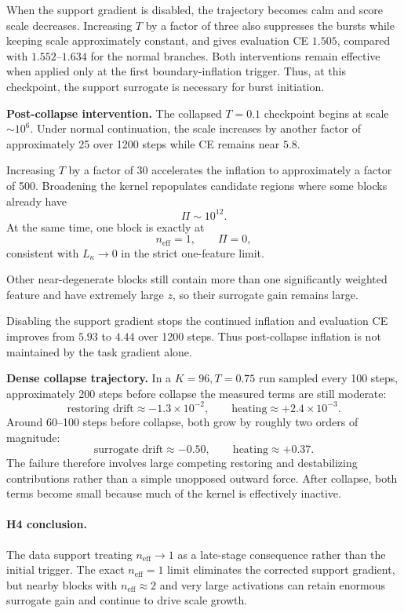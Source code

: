 \documentclass[11pt,a4paper]{article}
\newcommand{\neff}{n_{\mathrm{eff}}}
\newcommand{\Pisurr}{\Pi}
\begin{document}
When the support gradient is disabled, the trajectory becomes calm and score scale decreases. Increasing \(T\) by a factor of three also suppresses the bursts while keeping scale approximately constant, and gives evaluation CE \(1.505\), compared with \(1.552\)--\(1.634\) for the normal branches. Both interventions remain effective when applied only at the first boundary-inflation trigger. Thus, at this checkpoint, the support surrogate is necessary for burst initiation.

\textbf{Post-collapse intervention.}
The collapsed \(T=0.1\) checkpoint begins at scale \(\sim10^6\). Under normal continuation, the scale increases by another factor of approximately 25 over 1200 steps while CE remains near \(5.8\).

Increasing \(T\) by a factor of 30 accelerates the inflation to approximately a factor of 500. Broadening the kernel repopulates candidate regions where some blocks already have
\[
\Pisurr\sim10^{12}.
\]
At the same time, one block is exactly at
\[
\neff=1,\qquad \Pisurr=0,
\]
consistent with \(L_\kappa\to0\) in the strict one-feature limit.

Other near-degenerate blocks still contain more than one significantly weighted feature and have extremely large \(z\), so their surrogate gain remains large.

Disabling the support gradient stops the continued inflation and evaluation CE improves from \(5.93\) to \(4.44\) over 1200 steps. Thus post-collapse inflation is not maintained by the task gradient alone.

\textbf{Dense collapse trajectory.}
In a \(K=96,T=0.75\) run sampled every 100 steps, approximately 200 steps before collapse the measured terms are still moderate:
\[
\text{restoring drift}\approx-1.3\times10^{-2},\qquad
\text{heating}\approx+2.4\times10^{-3}.
\]
Around 60--100 steps before collapse, both grow by roughly two orders of magnitude:
\[
\text{surrogate drift}\approx-0.50,\qquad
\text{heating}\approx+0.37.
\]
The failure therefore involves large competing restoring and destabilizing contributions rather than a simple unopposed outward force. After collapse, both terms become small because much of the kernel is effectively inactive.

\paragraph{H4 conclusion.}
The data support treating \(\neff\to1\) as a late-stage consequence rather than the initial trigger. The exact \(\neff=1\) limit eliminates the corrected support gradient, but nearby blocks with \(\neff\approx2\) and very large activations can retain enormous surrogate gain and continue to drive scale growth.
\end{document}
